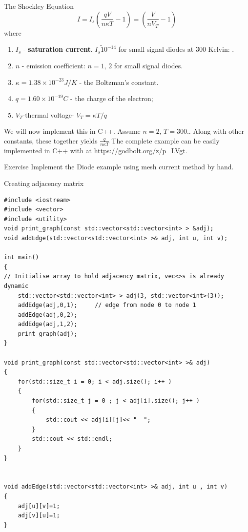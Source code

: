 \documentclass[xcolor=dvipsnames]{beamer}
\begin{document}
\begin{frame}{The Shockley Equation}
\[I=I_s\left(\frac{qV}{n\kappa T}-1\right)=\left(\frac{V}{nV_T}-1\right)\]
where
\begin{enumerate}
    \item $I_s$ - \textbf{saturation current}. $I_s\tilde 10^{-14}$ for small signal diodes at $300$ Kelvin: .
    \item $n$ - emission coefficient: $n=1,\,2$ for small signal diodes.
    \item $\kappa=1.38\times 10^{-23} J/K$ - the Boltzman's constant.
    \item $q=1.60\times 10^{-19}C$ - the charge of the electron;
    \item $V_T$-thermal voltage- $V_T=\kappa T/q$
\end{enumerate}
We will now implement this in C++. Assume $n=2$, $T=300.$. Along with other constants, these together yields $\frac{q}{n\kappa T}$ The complete example can be easily implemented in C++ with  \href{http://eigen.tuxfamily.org/index.php?title=Main_Page}{}
at \url{https://godbolt.org/z/p_LVgt}.

\end{frame}

\begin{frame}{Exercise}
	Implement the Diode example using mesh current method by hand.
\end{frame}

\begin{frame}[fragile,shrink=5]{Creating adjacency matrix}
\begin{verbatim}
#include <iostream>
#include <vector>
#include <utility>
void print_graph(const std::vector<std::vector<int> > &adj);
void addEdge(std::vector<std::vector<int> >& adj, int u, int v);

int main()
{
// Initialise array to hold adjacency matrix, vec<>s is already dynamic
    std::vector<std::vector<int> > adj(3, std::vector<int>(3));
    addEdge(adj,0,1);     // edge from node 0 to node 1
    addEdge(adj,0,2);
    addEdge(adj,1,2);
    print_graph(adj);
}

void print_graph(const std::vector<std::vector<int> >& adj)
{
    for(std::size_t i = 0; i < adj.size(); i++ )
    {
        for(std::size_t j = 0 ; j < adj[i].size(); j++ )
        {
            std::cout << adj[i][j]<< "  ";
        }
        std::cout << std::endl;
    }
}


void addEdge(std::vector<std::vector<int> >& adj, int u , int v)
{
    adj[u][v]=1;
    adj[v][u]=1;
}

\end{verbatim}	
\end{frame}
\end{document}
